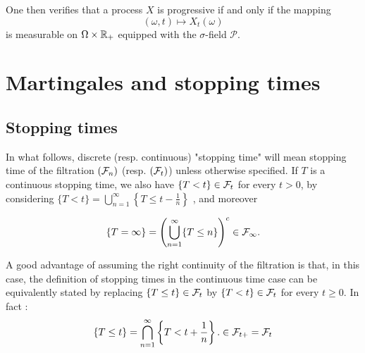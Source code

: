 \documentclass[../Main.tex]{subfiles}
\begin{document}
One then verifies that a process $X$ is progressive if and only if the mapping
\[ (\omega,t)\longmapsto X_t(\omega) \]
is measurable on $\Omega\times\mathbb{R}_+$ equipped with the $\sigma$-field $\mathcal P$.


\section{Martingales and stopping times} \label{sec:martingale_stoppig_time}


\subsection{Stopping times}

In what follows, discrete (resp. continuous) "stopping time" will mean stopping time of the filtration $(\mathcal{F}_n)$ (resp. $(\mathcal{F}_t)$) unless otherwise specified. If $T$ is a continuous stopping time, we also have $\{T < t\} \in \mathcal{F}_t$ for every $t > 0$, by considering $\{T < t\} = \bigcup_{n=1}^{\infty} \left\{ T \leq t - \frac{1}{n} \right\}$ , and moreover

\[ \{T = \infty\} = \left( \bigcup_{n=1}^{\infty} \{T \leq n\} \right)^c \in \mathcal{F}_{\infty}. \]

A good advantage of assuming the right continuity of the filtration is that, in this case, the definition of stopping times in the continuous time  case can be equivalently stated by replacing $\{T \leq t\} \in \mathcal{F}_t$ by $\{T < t\} \in \mathcal{F}_t$ for every $t \geq 0$. In fact : 
\[ \{T \leq t\} = \bigcap_{n=1}^{\infty} \left\{T < t + \frac{1}{n}\right\}. \in \mathcal{F}_{t+} = \mathcal{F}_t \]
\end{document}
